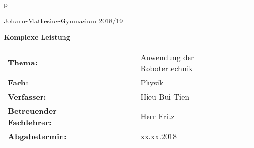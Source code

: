 \begin{titlepage}

\begin{center}

\begin{tabular}{p{\textwidth}}

Johann-Mathesius-Gymnasium \hfill 2018/19

\vspace{2cm}

\begin{center}
\LARGE{\textbf{Komplexe Leistung}}
\end{center}

\vspace{3cm}

\begin{tabular}{llllll}
\textbf{Thema:} & & & & & Anwendung der Robotertechnik
\vspace{3cm}
\\
\textbf{Fach:} & & & & & Physik
\\
\textbf{Verfasser:} & & & & & Hieu Bui Tien
\\
\textbf{Betreuender Fachlehrer:} & & & & &  Herr Fritz
\vspace{7cm}
\\
\textbf{Abgabetermin:} & & & & & xx.xx.2018
\end{tabular}

\end{tabular}

\end{center}

\end{titlepage}